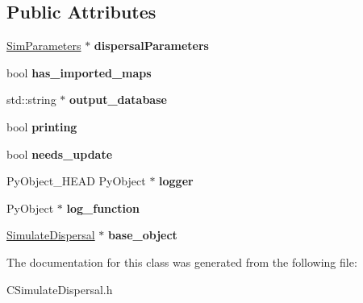 \subsection*{Public Attributes}
\begin{DoxyCompactItemize}
\item 
\hyperlink{struct_sim_parameters}{Sim\+Parameters} $\ast$ {\bfseries dispersal\+Parameters}\hypertarget{class_py_simulate_dispersal_a81fba3af1dfd1a32f2e8f543ab8ddae6}{}\label{class_py_simulate_dispersal_a81fba3af1dfd1a32f2e8f543ab8ddae6}

\item 
bool {\bfseries has\+\_\+imported\+\_\+maps}\hypertarget{class_py_simulate_dispersal_a5594ed1200643d899b5eb2541488217a}{}\label{class_py_simulate_dispersal_a5594ed1200643d899b5eb2541488217a}

\item 
std\+::string $\ast$ {\bfseries output\+\_\+database}\hypertarget{class_py_simulate_dispersal_a5944a844f78b81476745a6f80bdac650}{}\label{class_py_simulate_dispersal_a5944a844f78b81476745a6f80bdac650}

\item 
bool {\bfseries printing}\hypertarget{class_py_simulate_dispersal_a95ccf647e55688481b7a9daaaa1f99b8}{}\label{class_py_simulate_dispersal_a95ccf647e55688481b7a9daaaa1f99b8}

\item 
bool {\bfseries needs\+\_\+update}\hypertarget{class_py_simulate_dispersal_af344386936e2e70b17d44351f63d2af9}{}\label{class_py_simulate_dispersal_af344386936e2e70b17d44351f63d2af9}

\item 
Py\+Object\+\_\+\+H\+E\+AD Py\+Object $\ast$ {\bfseries logger}\hypertarget{class_py_template_a5b741a472639d65f9bcad29afa16ec99}{}\label{class_py_template_a5b741a472639d65f9bcad29afa16ec99}

\item 
Py\+Object $\ast$ {\bfseries log\+\_\+function}\hypertarget{class_py_template_a98bb8152faa73d028342d5cf260f0372}{}\label{class_py_template_a98bb8152faa73d028342d5cf260f0372}

\item 
\hyperlink{class_simulate_dispersal}{Simulate\+Dispersal} $\ast$ {\bfseries base\+\_\+object}\hypertarget{class_py_template_ac7bf12e84289f480eaa79fd7c421614a}{}\label{class_py_template_ac7bf12e84289f480eaa79fd7c421614a}

\end{DoxyCompactItemize}


The documentation for this class was generated from the following file\+:\begin{DoxyCompactItemize}
\item 
C\+Simulate\+Dispersal.\+h\end{DoxyCompactItemize}
